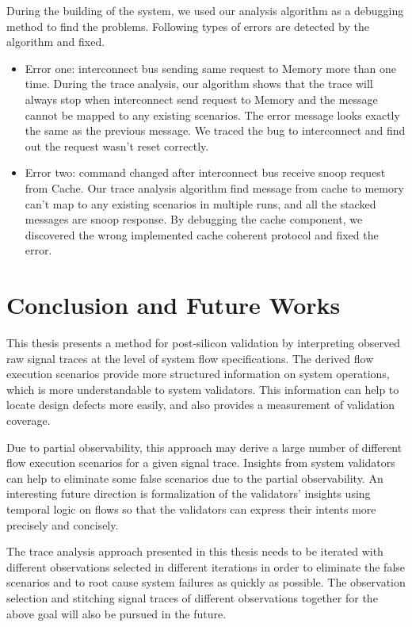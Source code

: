 \documentclass[12pt,frontmatter,copyright,thesis]{usfmanus}
\begin{document}
During the building of the system, we used our analysis algorithm
as a debugging method to find the problems. Following types of errors
are detected by the algorithm and fixed.
\begin{itemize}
\item 
Error one: interconnect bus sending same request to Memory more than one time. 
During the trace analysis, our algorithm shows that the trace will always stop when interconnect send
 request to Memory and the message cannot be mapped to any existing scenarios. The error message
 looks exactly the same as the previous message. We traced the bug to interconnect and find out the request
 wasn't reset correctly.
 \item
Error two: command changed after interconnect bus receive snoop request from Cache. 
Our trace analysis algorithm find message from cache to memory can't map to any existing scenarios in 
multiple runs, and all the stacked messages are snoop response. By debugging the cache component,
we discovered the wrong implemented cache coherent protocol and fixed the error.

\end{itemize}
\chapter{Conclusion and Future Works}
This thesis presents a method for post-silicon validation by
interpreting observed raw signal traces at the level of
system flow specifications.  The derived flow execution
scenarios provide more structured information on system
operations, which is more understandable to system
validators.  This information can help to locate design
defects more easily, and also provides a measurement of
validation coverage.

Due to partial observability, this approach may derive a
large number of different flow execution scenarios for a
given signal trace.  Insights from system validators can
help to eliminate some false scenarios due to the partial
observability.  An interesting future direction is
formalization of the validators' insights using temporal
logic on flows so that the validators can express their
intents more precisely and concisely.

The trace analysis approach presented in this thesis needs to
be iterated with different observations selected in
different iterations in order to eliminate the false
scenarios and to root cause system failures as quickly as
possible.  The observation selection and stitching signal
traces of different observations together for the above goal
will also be pursued in the future.
\end{document}

